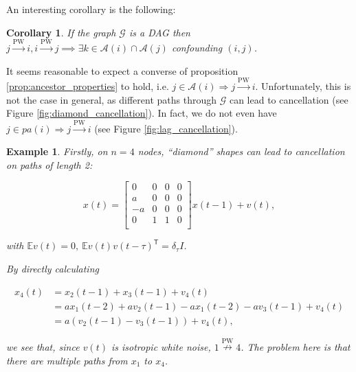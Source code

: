 \documentclass{statsoc}
\def\pwgc{\overset{\text{PW}}{\rightarrow}}  %
\def\npwgc{\overset{\text{PW}}{\nrightarrow}}  %
\def\gcg{\mathcal{G}}  %
\newcommand{\pa}[1]{pa(#1)}  %
\newcommand{\anc}[1]{\mathcal{A}(#1)}  %
\newtheorem{corollary}{Corollary}
\newtheorem{example}{Example}
\def\E{\mathbb{E}}  %
\def\T{\mathsf{T}}  %
\begin{document}
An interesting corollary is the following:

\begin{corollary}
  If the graph $\gcg$ is a DAG then $j \pwgc i, i \pwgc j \implies \exists k \in \anc{i} \cap \anc{j}$ confounding $(i, j)$.
\end{corollary}

It seems reasonable to expect a converse of proposition
\ref{prop:ancestor_properties} to hold, i.e.
$j \in \anc{i} \Rightarrow j \pwgc i$.  Unfortunately, this is not the
case in general, as different paths through $\gcg$ can lead to
cancellation (see Figure \ref{fig:diamond_cancellation}).  In fact, we
do not even have $j \in \pa{i} \Rightarrow j \pwgc i$ (see Figure
\ref{fig:lag_cancellation}).

\begin{example}
  \label{ex:diamond_cancellation}
  Firstly, on $n = 4$ nodes, ``diamond'' shapes can lead to cancellation on paths of length 2:

\begin{equation*}
  x(t) =
  \left[
    \begin{array}{cccc}
      0 & 0 & 0 & 0\\
      a & 0 & 0 & 0\\
      -a & 0 & 0 & 0\\
      0 & 1 & 1 & 0\\
    \end{array}
  \right] x(t - 1) + v(t),
\end{equation*}

with $\E v(t) = 0,\ \E v(t)v(t - \tau)^\T = \delta_\tau I$.

By directly calculating

\begin{align*}
  x_4(t) &= x_2(t - 1) + x_3(t - 1) + v_4(t)\\
         &= ax_1(t - 2) + av_2(t - 1) - ax_1(t - 2) -av_3(t - 1) + v_4(t)\\
         &= a(v_2(t - 1) - v_3(t - 1)) + v_4(t),
\end{align*}

we see that, since $v(t)$ is isotropic white noise, $1 \npwgc 4$.  The problem here is that there are multiple paths from $x_1$ to $x_4$.
\end{example}
\end{document}
